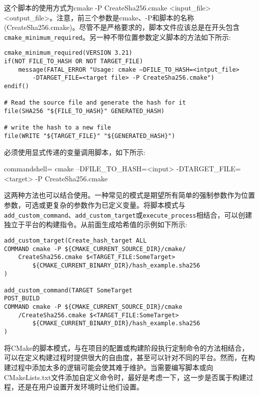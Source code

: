 这个脚本的使用方式为cmake -P CreateSha256.cmake <input\_file> <output\_file>。注意，前三个参数是cmake、-P和脚本的名称(CreateSha256.cmake)。尽管不是严格要求的，脚本文件应该总是在开头包含\texttt{cmake\_minimum\_required}。另一种不带位置参数定义脚本的方法如下所示:

\begin{lstlisting}[style=styleCMake]
cmake_minimum_required(VERSION 3.21)
if(NOT FILE_TO_HASH OR NOT TARGET_FILE)
	message(FATAL_ERROR "Usage: cmake –DFILE_TO_HASH=<intput_file> 
		-DTARGET_FILE=<target file> -P CreateSha256.cmake")
endif()

# Read the source file and generate the hash for it
file(SHA256 "${FILE_TO_HASH}" GENERATED_HASH)

# write the hash to a new file
file(WRITE "${TARGET_FILE}" "${GENERATED_HASH}")
\end{lstlisting}

必须使用显式传递的变量调用脚本，如下所示:

\begin{tcblisting}{commandshell={}}
cmake –DFILE_TO_HASH=<input>
      -DTARGET_FILE=<target> -P CreateSha256.cmake
\end{tcblisting}

这两种方法也可以结合使用。一种常见的模式是期望所有简单的强制参数作为位置参数，可选或更复杂的参数作为已定义变量。将脚本模式与\texttt{add\_custom\_command}、\texttt{add\_custom\_target}或\texttt{execute\_process}相结合，可以创建独立于平台的构建指令。从前面生成哈希值的示例如下所示:

\begin{lstlisting}[style=styleCMake]
add_custom_target(Create_hash_target ALL
COMMAND cmake -P ${CMAKE_CURRENT_SOURCE_DIR}/cmake/
	CreateSha256.cmake $<TARGET_FILE:SomeTarget>
		${CMAKE_CURRENT_BINARY_DIR}/hash_example.sha256
)

add_custom_command(TARGET SomeTarget
POST_BUILD
COMMAND cmake -P ${CMAKE_CURRENT_SOURCE_DIR}/cmake
	/CreateSha256.cmake $<TARGET_FILE:SomeTarget>
		${CMAKE_CURRENT_BINARY_DIR}/hash_example.sha256
)
\end{lstlisting}

将CMake的脚本模式，与在项目的配置或构建阶段执行定制命令的方法相结合，可以在定义构建过程时提供很大的自由度，甚至可以针对不同的平台。然而，在构建过程中添加太多的逻辑可能会使其难于维护。当需要编写脚本或向CMakeLists.txt文件添加自定义命令时，最好是考虑一下，这一步是否属于构建过程，还是在用户设置开发环境时让他们设置。





























